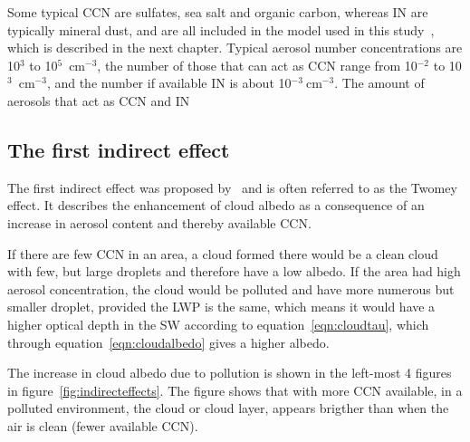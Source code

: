 Some typical CCN are sulfates, sea salt and organic carbon, whereas IN are typically mineral dust, and are all included in the model used in this study~\citep{Thompson2014}, which is described in the next chapter. Typical aerosol number concentrations are 10$^3$ to 10$^5$~$\text{cm}^{-3}$, the number of those that can act as CCN range from 10$^{-2}$ to 10$^3$~$\text{cm}^{-3}$, and the number if available IN is about 10$^{-3}~\text{cm}^{-3}$. The amount of aerosols that act as CCN and IN 
 
\subsection{The first indirect effect}
The first indirect effect was proposed by~\citet{Twomey1974} and is often referred to as the Twomey effect. It describes the enhancement of cloud albedo as a consequence of an increase in aerosol content and thereby available CCN.

If there are few CCN in an area, a cloud formed there would be a clean cloud with few, but large droplets and therefore have a low albedo. If the area had high aerosol concentration, the cloud would be polluted and have more numerous but smaller droplet, provided the LWP is the same, which means it would have a higher optical depth in the SW according to equation~\ref{eqn:cloudtau}, which through equation~\ref{eqn:cloudalbedo} gives a higher albedo.

The increase in cloud albedo due to pollution is shown in the left-most 4 figures in figure~\ref{fig:indirecteffects}. The figure shows that with more CCN available, in a polluted environment, the cloud or cloud layer, appears brigther than when the air is clean (fewer available CCN).

